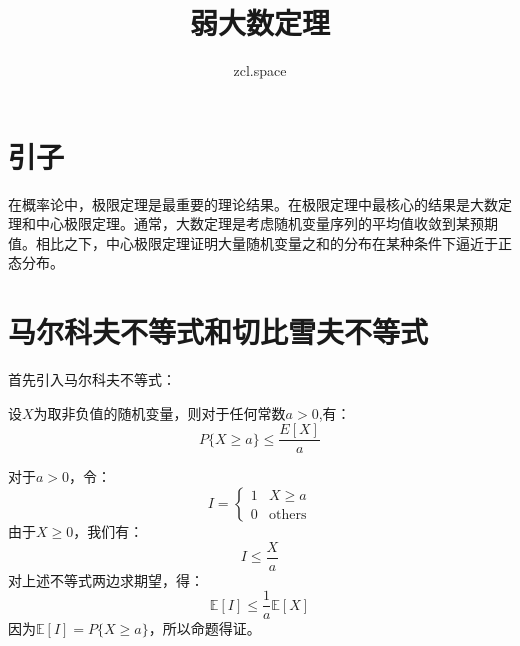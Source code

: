 \documentclass[10pt,a4paper,UTF8]{article}
\author{zcl.space}
\date{}
\title{弱大数定理}
\begin{document}
\maketitle
\tableofcontents
{}

\section{引子}
\label{sec:orge0f4e09}


在概率论中，极限定理是最重要的理论结果。在极限定理中最核心的结果是大数定理和中心极限定理。通常，大数定理是考虑随机变量序列的平均值收敛到某预期值。相比之下，中心极限定理证明大量随机变量之和的分布在某种条件下逼近于正态分布。

\section{马尔科夫不等式和切比雪夫不等式}
\label{sec:orgc3511dc}


首先引入马尔科夫不等式：
\begin{tikztheorem}
设\(X\)为取非负值的随机变量，则对于任何常数\(a > 0\),有：
\begin{equation}
\label{eq:1}
P\{ X \geq a \} \leq \frac{E[X]}{a}
\end{equation}
\end{tikztheorem}

\begin{tikzproof}
对于\(a > 0\)，令：
\begin{equation}
\label{eq:2}
I =
\begin{cases}
1 & X \geq a\\
0 & \mathrm{others}
\end{cases}
\end{equation}
由于\(X\geq 0\)，我们有：
\begin{equation}
\label{eq:3}
I \leq \frac{X}{a}
\end{equation}
对上述不等式两边求期望，得：
\begin{equation}
\label{eq:4}
\mathbb{E}[I] \leq \frac{1}{a}\mathbb{E}[X]
\end{equation}
因为\(\mathbb{E}[I] = P\{X\geq a\}\)，所以命题得证。
\end{tikzproof}
\end{document}
